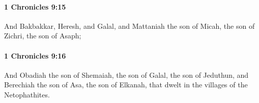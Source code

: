 		\paragraph{1 Chronicles 9:15} %
			\label{1CHRONICLES-9-15}

			And Bakbakkar, Heresh, and Galal, and Mattaniah the son of Micah, the son of Zichri, the son of Asaph;


		\paragraph{1 Chronicles 9:16} %
			\label{1CHRONICLES-9-16}

			And Obadiah the son of Shemaiah, the son of Galal, the son of Jeduthun, and Berechiah the son of Asa, the son of Elkanah, that dwelt in the villages of the Netophathites.


